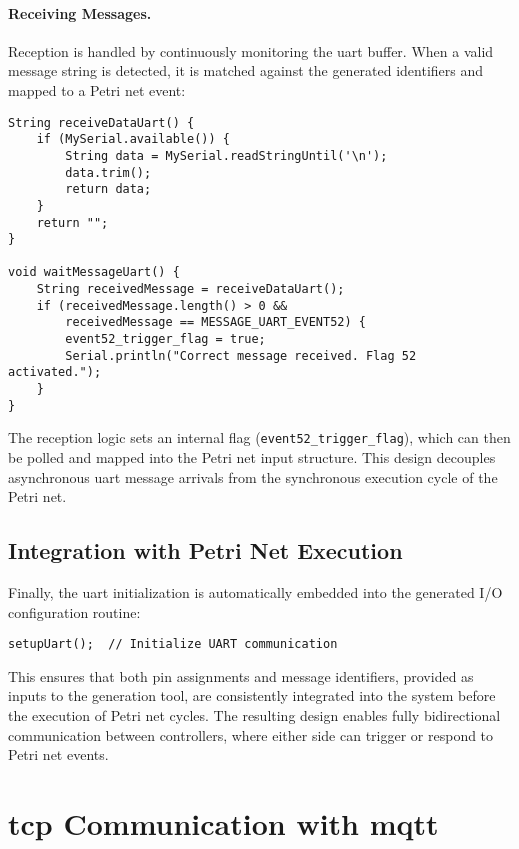 \paragraph{Receiving Messages.}  
Reception is handled by continuously monitoring the \gls{uart} buffer. When a valid message string is detected, it is matched against the generated identifiers and mapped to a Petri net event:
\begin{verbatim}
String receiveDataUart() {
    if (MySerial.available()) {
        String data = MySerial.readStringUntil('\n');
        data.trim();
        return data;
    }
    return "";
}

void waitMessageUart() {
    String receivedMessage = receiveDataUart();
    if (receivedMessage.length() > 0 && 
        receivedMessage == MESSAGE_UART_EVENT52) {
        event52_trigger_flag = true;
        Serial.println("Correct message received. Flag 52 activated.");
    }
}
\end{verbatim}

\noindent
The reception logic sets an internal flag (\texttt{event52\_trigger\_flag}), which can then be polled and mapped into the Petri net input structure. This design decouples asynchronous \gls{uart} message arrivals from the synchronous execution cycle of the Petri net.

\subsection{Integration with Petri Net Execution}
Finally, the \gls{uart} initialization is automatically embedded into the generated I/O configuration routine:
\begin{verbatim}
setupUart();  // Initialize UART communication
\end{verbatim}
This ensures that both pin assignments and message identifiers, provided as inputs to the generation tool, are consistently integrated into the system before the execution of Petri net cycles. The resulting design enables fully bidirectional communication between controllers, where either side can trigger or respond to Petri net events.

\section{\gls{tcp} Communication with \gls{mqtt}}
\label{sec:tcp_mqtt_implementation}

